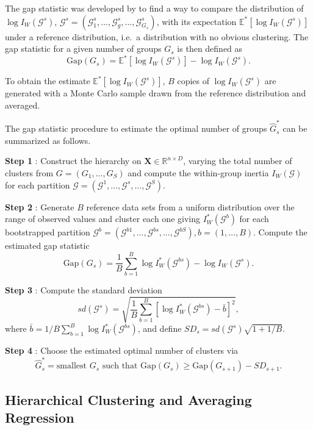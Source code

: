 \documentclass[]{book}
\begin{document}
The gap statistic was developed by \citep{tibshirani_estimating_2001} to find
a way to compare the distribution of \(\log I_W(\mathcal{G}^s)\),
\(\mathcal{G}^s = ( \mathcal{G}^s_1, \dots, \mathcal{G}^s_g, \dots, \mathcal{G}^s_{G_s})\),
with its expectation \(\mathbb{E}^*[\log I_W(\mathcal{G}^s)]\) under a
reference distribution, i.e.~a distribution with no obvious clustering.
The gap statistic for a given number of groups \(G_s\) is then defined as
\[\text{Gap}(G_s) = \mathbb{E}^*[\log I_W(\mathcal{G}^s)] - \log I_W(\mathcal{G}^s).\]

To obtain the estimate \(\mathbb{E}^*[\log I_W(\mathcal{G}^s)]\), \(B\) copies
of \(\log I_W(\mathcal{G}^s)\) are generated with a Monte Carlo sample drawn
from the reference distribution and averaged.

The gap statistic procedure to estimate the optimal number of groups
\(\hat{G}_s^*\) can be summarized as follows.

\textbf{Step 1} : Construct the hierarchy on \(\mathbf{X} \in \mathbb{R}^{n \times D}\), varying the
total number of clusters from \(G = (G_1, \dots, G_S)\) and compute
the within-group inertia \(I_W(\mathcal{G})\) for each partition
\(\mathcal{G}= (\mathcal{G}^1,\dots,\mathcal{G}^s, \dots, \mathcal{G}^S)\).

\textbf{Step 2} : Generate \(B\) reference data sets from a uniform distribution over
the range of observed values and cluster each one giving
\(I_{W}^*(\mathcal{G}^b)\) for each bootstrapped partition
\(\mathcal{G}^b= (\mathcal{G}^{b1},\dots,\mathcal{G}^{bs}, \dots, \mathcal{G}^{bS}), b = (1,\dots,B)\).
Compute the estimated gap statistic
\[\text{Gap}(G_s) = \frac{1}{B} \sum_{b=1}^B \log I_W^*(\mathcal{G}^{bs}) - \log I_W(\mathcal{G}^s).\]

\textbf{Step 3} : Compute the standard deviation
\[sd(\mathcal{G}^s) = \sqrt{\frac{1}{B} \sum_{b=1}^B [\log I_W^*(\mathcal{G}^{bs}) - \bar{b}]^2},\]
where \(\bar{b} = 1/B \sum_{b=1}^B \log I_W^*(\mathcal{G}^{bs})\), and
define \(SD_s = sd(\mathcal{G}^s) \sqrt{1 + 1/B}\).

\textbf{Step 4} : Choose the estimated optimal number of clusters via
\[\hat{G}_s^* = \text{smallest } G_s \text{ such that } \text{Gap}(G_s) \geq  \text{Gap}(G_{s+1}) - SD_{s+1}.\]

\hypertarget{HCAR}{%
\subsection{Hierarchical Clustering and Averaging Regression}\label{HCAR}}
\end{document}
